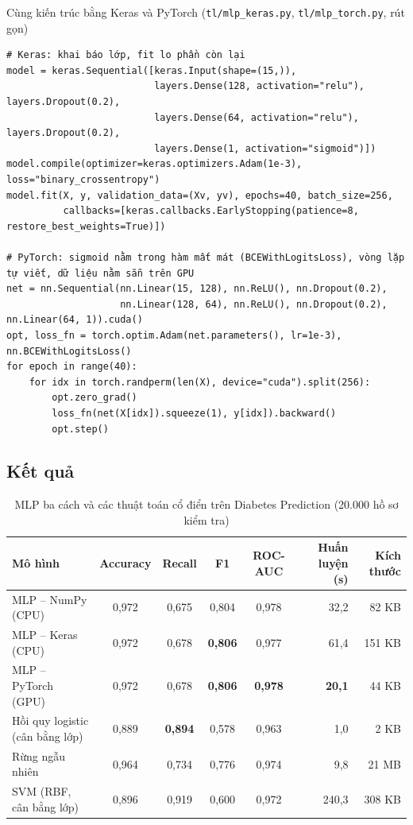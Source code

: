\begin{code}{Cùng kiến trúc bằng Keras và PyTorch (\texttt{tl/mlp\_keras.py}, \texttt{tl/mlp\_torch.py}, rút gọn)}
\label{lst:ch2-keras-torch}
\begin{verbatim}
# Keras: khai báo lớp, fit lo phần còn lại
model = keras.Sequential([keras.Input(shape=(15,)),
                          layers.Dense(128, activation="relu"), layers.Dropout(0.2),
                          layers.Dense(64, activation="relu"), layers.Dropout(0.2),
                          layers.Dense(1, activation="sigmoid")])
model.compile(optimizer=keras.optimizers.Adam(1e-3), loss="binary_crossentropy")
model.fit(X, y, validation_data=(Xv, yv), epochs=40, batch_size=256,
          callbacks=[keras.callbacks.EarlyStopping(patience=8, restore_best_weights=True)])

# PyTorch: sigmoid nằm trong hàm mất mát (BCEWithLogitsLoss), vòng lặp tự viết, dữ liệu nằm sẵn trên GPU
net = nn.Sequential(nn.Linear(15, 128), nn.ReLU(), nn.Dropout(0.2),
                    nn.Linear(128, 64), nn.ReLU(), nn.Dropout(0.2), nn.Linear(64, 1)).cuda()
opt, loss_fn = torch.optim.Adam(net.parameters(), lr=1e-3), nn.BCEWithLogitsLoss()
for epoch in range(40):
    for idx in torch.randperm(len(X), device="cuda").split(256):
        opt.zero_grad()
        loss_fn(net(X[idx]).squeeze(1), y[idx]).backward()
        opt.step()
\end{verbatim}
\end{code}

\subsection{Kết quả}

\begin{table}[H]
\centering
\caption{MLP ba cách và các thuật toán cổ điển trên Diabetes Prediction (20.000 hồ sơ kiểm tra)}
\label{tab:ch2-three}
\small
\begin{tabular}{@{}lccccrr@{}}
\toprule
\textbf{Mô hình} & \textbf{Accuracy} & \textbf{Recall} & \textbf{F1} & \textbf{ROC-AUC} & \textbf{Huấn luyện (s)} & \textbf{Kích thước} \\
\midrule
MLP – NumPy (CPU) & 0,972 & 0,675 & 0,804 & 0,978 & 32,2 & 82 KB \\
MLP – Keras (CPU) & 0,972 & 0,678 & \textbf{0,806} & 0,977 & 61,4 & 151 KB \\
MLP – PyTorch (GPU) & 0,972 & 0,678 & \textbf{0,806} & \textbf{0,978} & \textbf{20,1} & 44 KB \\
\midrule
Hồi quy logistic (cân bằng lớp) & 0,889 & \textbf{0,894} & 0,578 & 0,963 & 1,0 & 2 KB \\
Rừng ngẫu nhiên & 0,964 & 0,734 & 0,776 & 0,974 & 9,8 & 21 MB \\
SVM (RBF, cân bằng lớp) & 0,896 & 0,919 & 0,600 & 0,972 & 240,3 & 308 KB \\
\bottomrule
\end{tabular}
\end{table}

